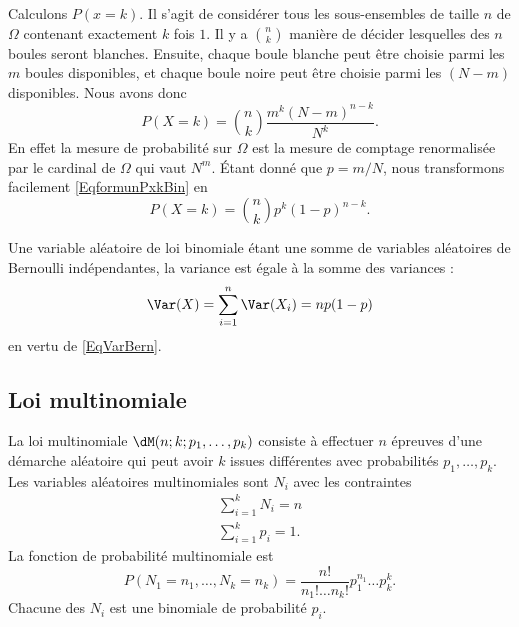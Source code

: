 Calculons \( P(x=k)\). Il s'agit de considérer tous les sous-ensembles de taille \( n\) de \( \Omega\) contenant exactement \( k\) fois \( 1\). Il y a \( {n\choose k}\) manière de décider lesquelles des \( n\) boules seront blanches. Ensuite, chaque boule blanche peut être choisie parmi les \( m\) boules disponibles, et chaque boule noire peut être choisie parmi les  \( (N-m)\) disponibles. Nous avons donc
\begin{equation}        \label{EqformunPxkBin}
    P(X=k)={n\choose k}\frac{ m^k(N-m)^{n-k} }{ N^k }.
\end{equation}
En effet la mesure de probabilité sur \( \Omega\) est la mesure de comptage renormalisée par le cardinal de \( \Omega\) qui vaut \( N^m\). Étant donné que \( p=m/N\), nous transformons facilement \eqref{EqformunPxkBin} en
\begin{equation}
    P(X=k)={n\choose k}p^k(1-p)^{n-k}.
\end{equation}

Une variable aléatoire de loi binomiale étant une somme de variables aléatoires de Bernoulli indépendantes, la variance est égale à la somme des variances :
\begin{equation}
    \Var(X)=\sum_{i=1}^n\Var(X_i)=np(1-p)
\end{equation}
en vertu de \eqref{EqVarBern}.

\subsection{Loi multinomiale}

La loi multinomiale \( \dM(n;k;p_1,\ldots, p_k)\) consiste à effectuer \( n\) épreuves d'une démarche aléatoire qui peut avoir \( k\) issues différentes avec probabilités \( p_1,\ldots, p_k\). Les variables aléatoires multinomiales sont \( N_i\) avec les contraintes
\begin{subequations}
    \begin{align}
        \sum_{i=1}^kN_i=n\\
        \sum_{i=1}^kp_i=1.
    \end{align}
\end{subequations}
La fonction de probabilité multinomiale est
\begin{equation}
    P(N_1=n_1,\ldots, N_k=n_k)=\frac{ n! }{ n_1!\ldots n_k! }p_1^{n_1}\ldots p_k^k.
\end{equation}
Chacune des \( N_i\) est une binomiale de probabilité \( p_i\).

